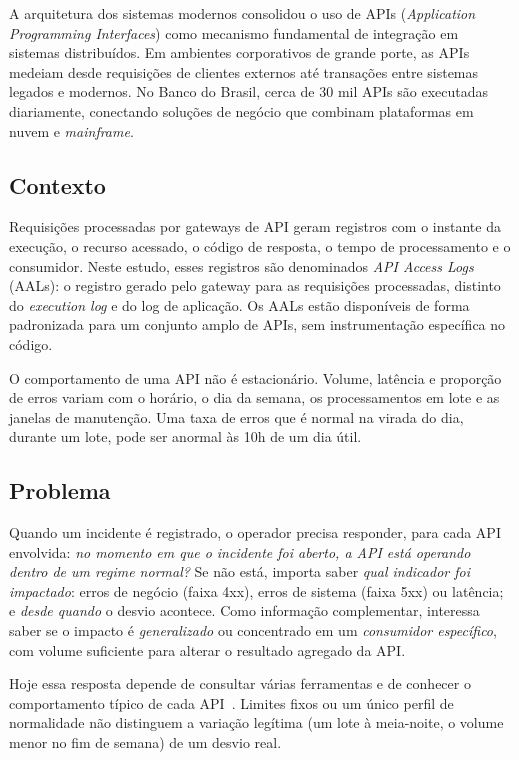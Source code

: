 \documentclass[sigconf,nonacm]{acmart}
\begin{document}
A arquitetura dos sistemas modernos consolidou o uso de APIs (\emph{Application Programming Interfaces}) como mecanismo fundamental de integração em sistemas distribuídos. Em ambientes corporativos de grande porte, as APIs medeiam desde requisições de clientes externos até transações entre sistemas legados e modernos. No Banco do Brasil, cerca de 30 mil APIs são executadas diariamente, conectando soluções de negócio que combinam plataformas em nuvem e \emph{mainframe}.

\subsection{Contexto}
Requisições processadas por gateways de API geram registros com o instante da execução, o recurso acessado, o código de resposta, o tempo de processamento e o consumidor. Neste estudo, esses registros são denominados \emph{API Access Logs} (AALs): o registro gerado pelo gateway para as requisições processadas, distinto do \emph{execution log} e do log de aplicação. Os AALs estão disponíveis de forma padronizada para um conjunto amplo de APIs, sem instrumentação específica no código.

O comportamento de uma API não é estacionário. Volume, latência e proporção de erros variam com o horário, o dia da semana, os processamentos em lote e as janelas de manutenção. Uma taxa de erros que é normal na virada do dia, durante um lote, pode ser anormal às 10h de um dia útil.

\subsection{Problema}
Quando um incidente é registrado, o operador precisa responder, para cada API envolvida: \emph{no momento em que o incidente foi aberto, a API está operando dentro de um regime normal?} Se não está, importa saber \emph{qual indicador foi impactado}: erros de negócio (faixa 4xx), erros de sistema (faixa 5xx) ou latência; e \emph{desde quando} o desvio acontece. Como informação complementar, interessa saber se o impacto é \emph{generalizado} ou concentrado em um \emph{consumidor específico}, com volume suficiente para alterar o resultado agregado da API.

Hoje essa resposta depende de consultar várias ferramentas e de conhecer o comportamento típico de cada API~\citep{zhang2025isre}. Limites fixos ou um único perfil de normalidade não distinguem a variação legítima (um lote à meia-noite, o volume menor no fim de semana) de um desvio real.
\end{document}
